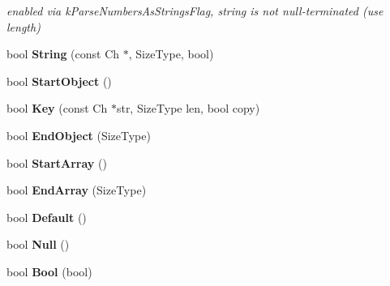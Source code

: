 \begin{DoxyCompactItemize}
\begin{DoxyCompactList}\small\item\em enabled via k\+Parse\+Numbers\+As\+Strings\+Flag, string is not null-\/terminated (use length) \end{DoxyCompactList}\item 
bool {\bfseries String} (const Ch $\ast$, Size\+Type, bool)\hypertarget{struct_base_reader_handler_a3ac69e6326d0aeef7b1f2619742bbe00}{}\label{struct_base_reader_handler_a3ac69e6326d0aeef7b1f2619742bbe00}

\item 
bool {\bfseries Start\+Object} ()\hypertarget{struct_base_reader_handler_ab0a7d9bcececb8d6ed748656f67f4917}{}\label{struct_base_reader_handler_ab0a7d9bcececb8d6ed748656f67f4917}

\item 
bool {\bfseries Key} (const Ch $\ast$str, Size\+Type len, bool copy)\hypertarget{struct_base_reader_handler_abc50b2e7e411b7b731715e05cd01e2eb}{}\label{struct_base_reader_handler_abc50b2e7e411b7b731715e05cd01e2eb}

\item 
bool {\bfseries End\+Object} (Size\+Type)\hypertarget{struct_base_reader_handler_a0406cee0af26bc3a0b7fb2414537b0ab}{}\label{struct_base_reader_handler_a0406cee0af26bc3a0b7fb2414537b0ab}

\item 
bool {\bfseries Start\+Array} ()\hypertarget{struct_base_reader_handler_a9dbb1143a250a904bb18a174553a3a00}{}\label{struct_base_reader_handler_a9dbb1143a250a904bb18a174553a3a00}

\item 
bool {\bfseries End\+Array} (Size\+Type)\hypertarget{struct_base_reader_handler_ae9d60a8779b6a77a7f283d64961879fb}{}\label{struct_base_reader_handler_ae9d60a8779b6a77a7f283d64961879fb}

\item 
bool {\bfseries Default} ()\hypertarget{struct_base_reader_handler_a836437f6ccc37f08ff933f009b18a78c}{}\label{struct_base_reader_handler_a836437f6ccc37f08ff933f009b18a78c}

\item 
bool {\bfseries Null} ()\hypertarget{struct_base_reader_handler_ae2ebbde4628bf3659ddc5d18520935f5}{}\label{struct_base_reader_handler_ae2ebbde4628bf3659ddc5d18520935f5}

\item 
bool {\bfseries Bool} (bool)\hypertarget{struct_base_reader_handler_aa1c3ce42dbb856b3349792dc9d963587}{}\label{struct_base_reader_handler_aa1c3ce42dbb856b3349792dc9d963587}


\end{DoxyCompactItemize}
